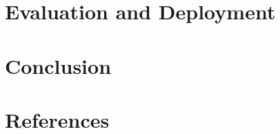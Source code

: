 \documentclass[11pt,twocolumn]{article}
\begin{document}
\section{Evaluation and Deployment}
\label{sec:eval}





\section{Conclusion}
\label{sec:conclusion}


\section*{References}

\end{document}
